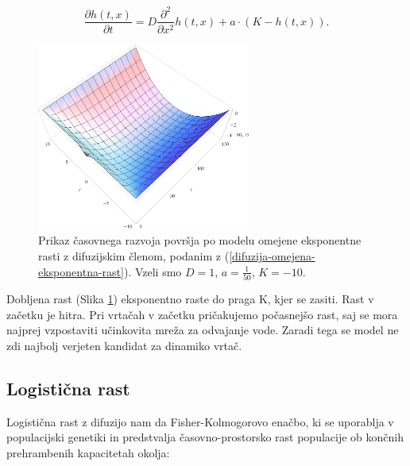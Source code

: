 \documentclass[a4paper, twoside, 12pt]{book}
\begin{document}
    \begin{equation}
      \frac{ \partial h(t,x) }{ \partial t} = D \frac{\partial^2}{\partial x^2} h(t,x) + a \cdot (K - h(t,x)).
      \label{difuzija-omejena-eksponentna-rast}
    \end{equation}
    \begin{figure}[h]
      \begin{center}
        \includegraphics[width=7cm]{slike/difuzija-omejena-eksponentna-rast2}
      \end{center}
      \caption{Prikaz časovnega razvoja površja po modelu omejene eksponentne rasti z difuzijskim členom, podanim z (\ref{difuzija-omejena-eksponentna-rast}). Vzeli smo $D=1$, $a=\frac{1}{50}$, $K=-10$.}
      \label{fig:difuzija-omejena-eksponentna-rast}
    \end{figure}

    Dobljena rast (Slika \ref{fig:difuzija-omejena-eksponentna-rast}) eksponentno raste do praga K, kjer se zasiti. Rast v začetku je hitra. Pri vrtačah v začetku pričakujemo počasnejšo rast, saj se mora najprej vzpostaviti učinkovita mreža za odvajanje vode. Zaradi tega se model ne zdi najbolj verjeten kandidat za dinamiko vrtač.


    \subsection{Logistična rast}
Logistična rast z difuzijo nam da Fisher-Kolmogorovo enačbo, ki se uporablja v populacijski genetiki in predstvalja časovno-prostorsko rast populacije ob končnih prehrambenih kapacitetah okolja:
\end{document}
